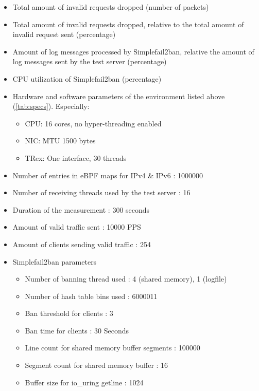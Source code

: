 \begin{itemize}
	\item Total amount of invalid requests dropped (number of packets)
	\item Total amount of invalid requests dropped, relative to the total amount of invalid
	request sent (percentage)
	\item Amount of log messages processed by Simplefail2ban, relative the amount of log messages
	sent by the test server (percentage)
	\item \ac{CPU} utilization of Simplefail2ban (percentage)
\end{itemize}

\begin{itemize}
	\item Hardware and software parameters of the environment listed above (\ref{tab:specs}). Especially:  
	\begin{itemize}
		\item \ac{CPU}: 16 cores, no hyper-threading enabled
		\item \ac{NIC}: MTU 1500 bytes
		\item TRex: One interface, 30 threads
	\end{itemize}
	\item Number of entries in \ac{eBPF} maps for \ac{IPv4} \& \ac{IPv6} : 1000000
	\item Number of receiving threads used by the test server : 16
	\item Duration of the measurement : 300 seconds
	\item Amount of valid traffic sent : 10000 \ac{PPS}
	\item Amount of clients sending valid traffic : 254
	\item Simplefail2ban parameters 
		\begin{itemize}
		\item Number of banning thread used : 4 (shared memory), 1 (logfile)
		\item Number of hash table bins used : 6000011
		\item Ban threshold for clients : 3
		\item Ban time for clients : 30 Seconds
		\item Line count for shared memory buffer segments : 100000
		\item Segment count for shared memory buffer : 16
		\item Buffer size for io\_uring getline : 1024
		\end{itemize}
\end{itemize}

